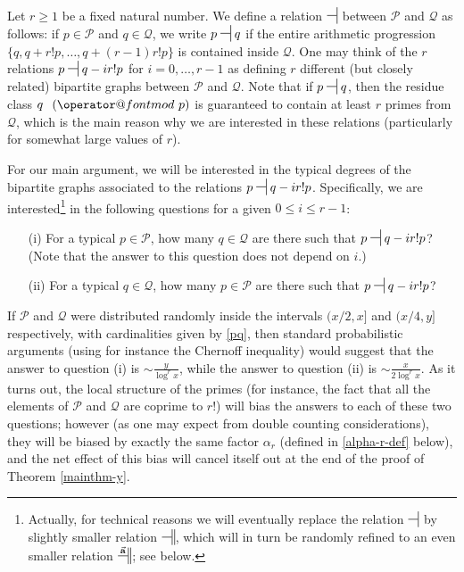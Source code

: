 \documentclass[12pt]{amsart}
\makeatletter
\numberwithin{equation}{section}  %
\theoremstyle{remark}
\theoremstyle{plain}
\numberwithin{equation}{section}
\renewcommand{\pmod}[1]{\allowbreak\mkern7mu({\operator@font mod}\,\,#1)}
\renewcommand{\leq}{\leqslant}
\renewcommand{\geq}{\geqslant}
\renewcommand{\(}{\left(}
\renewcommand{\)}{\right)}
\newcommand{\asym}{\sim}   %
\newcommand{\rel}{\nsststile{}{}}  %
\newcommand{\relr}{\nsdtstile{}{}} %
\newcommand{\relra}{\nsdtstile{}{\vect{\mathbf{a}}}} %
\newcommand{\vect}[1]{{\ensuremath{\vec{#1}}}}
\newcommand{\PP}{\mathcal{P}}
\newcommand{\QQ}{\mathcal{Q}}
\makeatother
\begin{document}
Let $r \geq 1$ be a fixed natural number.  We define a relation $\rel$
between $\PP$ and $\QQ$  as follows: if $p \in \PP$ and $q \in \QQ$,
we write $p \rel q$ if the entire arithmetic progression $\{ q, q+r!
p, \dots, q+(r-1)r! p \}$ is contained inside $\QQ$.   
One may think of the $r$ relations $p \rel q-ir!p$ for $i=0,\dots,r-1$
as defining $r$ different (but closely related) bipartite graphs
between $\PP$ and $\QQ$.  Note that if $p \rel q$, then the residue
class $q\ \pmod{p}$ is guaranteed to contain at least $r$ primes from
$\QQ$, which is the main reason why we are interested in these
relations (particularly for somewhat large values of $r$).


For our main argument, we will be interested in the typical degrees of the bipartite graphs associated to the relations $p \rel q-ir!p$.  Specifically, we are interested\footnote{Actually, for technical reasons we will eventually replace the relation $\rel$ by slightly smaller relation $\relr$, which will in turn be randomly refined to an even smaller relation $\relra$; see below.} in the following questions for a given $0 \leq i \leq r-1$:

\begin{itemize}
\item[(i)] For a typical $p \in \PP$, how many $q \in \QQ$ are there such that $p \rel q-ir!p$?  (Note that the answer to this question does not depend on $i$.)
\item[(ii)]  For a typical $q \in \QQ$, how many $p \in \PP$ are there such that $p \rel q-ir!p$?
\end{itemize}

If $\PP$ and $\QQ$ were distributed randomly inside the intervals $(x/2,x]$ and $(x/4,y]$ respectively, with cardinalities given by \eqref{pq}, then standard probabilistic arguments (using for instance the Chernoff inequality) would suggest that the answer to question (i) is $\asym\frac{y}{\log^r x}$, while the answer to question (ii) is $\asym\frac{x}{2 \log^r x}$.  As it turns out, the local structure of the primes (for instance, the fact that all the elements of $\PP$ and $\QQ$ are coprime to $r!$) will bias the answers to each of these two questions; however (as one may expect from double counting considerations), they will be biased by exactly the same factor $\alpha_r$ (defined in \eqref{alpha-r-def} below), and the net effect of this bias will cancel itself out at the end of the proof of Theorem \ref{mainthm-y}.
\end{document}
